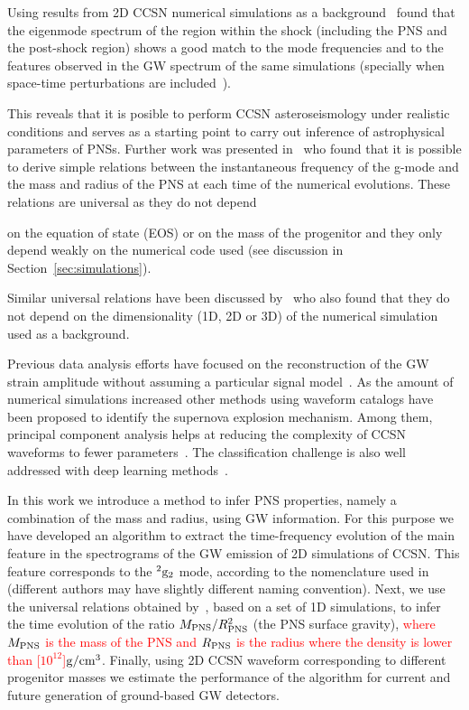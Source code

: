 Using results from 2D CCSN numerical simulations as a background~\citep{Torres:2018, Torres:2019a} found that the eigenmode spectrum of the region within the shock (including the PNS and the post-shock region) 
shows a good match to the mode frequencies and to the features observed in the GW spectrum of the same simulations (specially when space-time perturbations are included~\citep{Torres:2019a}).

This reveals that it is posible to perform CCSN asteroseismology {under realistic conditions} and serves as a starting point to carry out inference of astrophysical parameters of PNSs. Further work was presented in~\citep{Torres:2019b} who found that it is possible to derive simple relations between the instantaneous frequency of the g-mode and the mass and radius of the PNS {at each time of the numerical evolutions}. These relations are universal as they do not depend {on the equation of state (EOS) or on the mass of the progenitor {and they only depend weakly on} the numerical code used {(see discussion in Section~\ref{sec:simulations})}. {Similar universal relations have been discussed by~\citep{Sotani:2020a,Sotani:2020b} who also found that they do not depend on the dimensionality (1D, 2D or 3D) of the numerical simulation used as a background.

Previous data analysis efforts have focused on the reconstruction of the GW strain amplitude
without assuming a particular signal model~\citep{Summerscales:2008,Klimenko:2015ypf,CornLitt}. As the amount of numerical
simulations increased other methods using waveform catalogs have been proposed to identify
the supernova explosion mechanism.
Among them, principal component analysis helps at reducing the complexity of CCSN waveforms to fewer
parameters~\citep{Heng:2009,roever:09,Edwards:2014,powell:2016,powell:2017,Roma:2019kcd}.
The classification challenge is also well addressed with deep learning methods~\citep{astone:2018,Chan:2019fuz}.
    
{In this work we introduce a method to infer PNS properties, namely a combination of the mass and radius, using GW information. For this purpose we have developed an algorithm to  
  extract the time-frequency evolution of the main feature in the spectrograms of the GW emission of 2D simulations of CCSN. This feature corresponds to the $^2\rm{g}_2$ mode, according to the nomenclature used in~\citep{Torres:2019b} (different authors may have slightly different naming convention). Next, we use the universal relations obtained by~\citep{Torres:2019b}, based on a set of 1D simulations, to infer the time evolution of the ratio $M_{\rm PNS}/R_{\rm PNS}^2$ (the PNS surface gravity), \textcolor{red}{where $M_{\rm PNS}$ is the mass of the PNS and $R_{\rm PNS}$ is the radius where the density is lower than \unit[$10^{12}$]{$\rm g/cm^3$}}.
Finally, using 2D CCSN waveform corresponding to different progenitor masses we estimate the performance of the algorithm for current and future generation of ground-based GW detectors.

}}}
